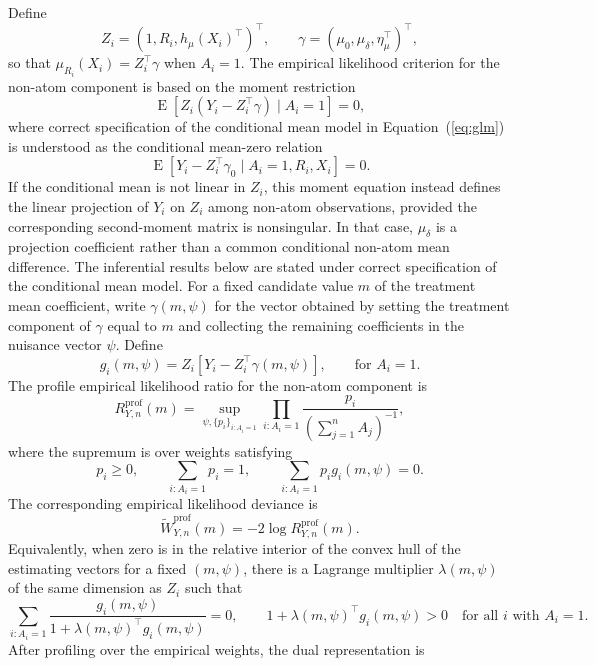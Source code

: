 \documentclass[11pt]{article}
\DeclareMathOperator{\E}{E}
\begin{document}
Define
\[
  Z_i =
  (1, R_i, h_\mu(X_i)^\top)^\top,
  \qquad
  \gamma =
  (\mu_0,\mu_\delta,\eta_\mu^\top)^\top,
\]
so that $\mu_{R_i}(X_i)=Z_i^\top\gamma$ when $A_i=1$. The empirical likelihood criterion for the non-atom component is based on the moment restriction
\begin{equation}
  \E\left[
    Z_i(Y_i-Z_i^\top\gamma)
    \mid A_i = 1
  \right] = 0,
  \label{eq:adjusted-el-moment}
\end{equation}
where correct specification of the conditional mean model in Equation~(\ref{eq:glm}) is understood as the conditional mean-zero relation
\[
  \E[Y_i-Z_i^\top\gamma_0\mid A_i=1,R_i,X_i]=0.
\]
If the conditional mean is not linear in $Z_i$, this moment equation instead defines the linear projection of $Y_i$ on $Z_i$ among non-atom observations, provided the corresponding second-moment matrix is nonsingular. In that case, $\mu_\delta$ is a projection coefficient rather than a common conditional non-atom mean difference. The inferential results below are stated under correct specification of the conditional mean model.
For a fixed candidate value $m$ of the treatment mean coefficient, write $\gamma(m,\psi)$ for the vector obtained by setting the treatment component of $\gamma$ equal to $m$ and collecting the remaining coefficients in the nuisance vector $\psi$. Define
\[
  g_i(m,\psi)
  =
  Z_i\left[Y_i-Z_i^\top\gamma(m,\psi)\right],
  \qquad \text{for } A_i=1.
\]
The profile empirical likelihood ratio for the non-atom component is
\begin{equation*}
  R_{Y,n}^{\mathrm{prof}}(m)
  =
  \sup_{\psi,\{p_i\}_{i:A_i=1}}
    \prod_{i:A_i=1}
    \frac{p_i}{\left(\sum_{j=1}^n A_j\right)^{-1}},
\end{equation*}
where the supremum is over weights satisfying
\[
  p_i \geq 0,
  \qquad
  \sum_{i:A_i=1} p_i = 1,
  \qquad
  \sum_{i:A_i=1} p_i g_i(m,\psi)=0.
\]
The corresponding empirical likelihood deviance is
\begin{equation*}
  \widetilde{W}_{Y,n}^{\mathrm{prof}}(m)
  =
  -2\log R_{Y,n}^{\mathrm{prof}}(m).
\end{equation*}
Equivalently, when zero is in the relative interior of the convex hull of the estimating vectors for a fixed $(m,\psi)$, there is a Lagrange multiplier $\lambda(m,\psi)$ of the same dimension as $Z_i$ such that
\[
  \sum_{i:A_i=1}
  \frac{g_i(m,\psi)}
  {1+\lambda(m,\psi)^\top g_i(m,\psi)}
  =0,
  \qquad
  1+\lambda(m,\psi)^\top g_i(m,\psi) > 0
  \quad\text{for all }i\text{ with }A_i=1.
\]
After profiling over the empirical weights, the dual representation is
\end{document}
